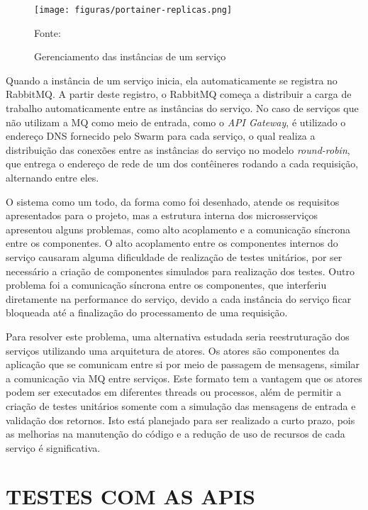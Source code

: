 \begin{figure}[H]
	\centering
	\caption{Gerenciamento das instâncias de um serviço}
	\texttt{[image: figuras/portainer-replicas.png]}

	\label{fig:portainer-replicas}
	\footnotesize Fonte: \fonteOAutor
\end{figure}

Quando a instância de um serviço inicia, ela automaticamente se registra
no RabbitMQ. A partir deste registro, o RabbitMQ começa a distribuir a carga
de trabalho automaticamente entre as instâncias do serviço. No caso de
serviços que não utilizam a \ac{MQ} como meio de entrada, como o
\emph{API Gateway}, é utilizado o endereço \ac{DNS} fornecido pelo Swarm
para cada serviço, o qual realiza a distribuição das conexões entre as
instâncias do serviço no modelo \emph{round-robin}, que entrega o
endereço de rede de um dos contêineres rodando a cada requisição, alternando
entre eles.

O sistema como um todo, da forma como foi desenhado, atende os requisitos
apresentados para o projeto, mas a estrutura interna dos microsserviços
apresentou alguns problemas, como alto acoplamento e a comunicação síncrona
entre os componentes. O alto acoplamento entre os componentes internos do
serviço causaram alguma dificuldade de realização de testes unitários, por
ser necessário a criação de componentes simulados para realização dos testes.
Outro problema foi a comunicação síncrona entre os componentes, que
interferiu diretamente na performance do serviço, devido a cada instância do
serviço ficar bloqueada até a finalização do processamento de uma requisição.

Para resolver este problema, uma alternativa estudada seria reestruturação
dos serviços utilizando uma arquitetura de atores. Os atores são componentes
da aplicação que se comunicam entre si por meio de passagem de mensagens,
similar a comunicação via \ac{MQ} entre serviços. Este formato tem a vantagem
que os atores podem ser executados em diferentes threads ou processos,
além de permitir a criação de testes unitários somente com a simulação das
mensagens de entrada e validação dos retornos. Isto está planejado para ser
realizado a curto prazo, pois as melhorias na manutenção do código e a
redução de uso de recursos de cada serviço é significativa.

\section{TESTES COM AS APIS}

